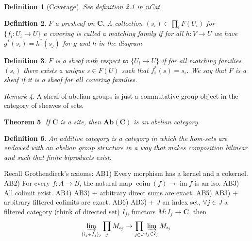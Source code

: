 \documentclass[12pt]{article}
\theoremstyle{darkgreentheorem}
\newtheorem{thm}{Theorem}[section]
\theoremstyle{darkbluedefinition}
\newtheorem{defn}[thm]{Definition}
\theoremstyle{darkredexample}
\theoremstyle{remark}
\newtheorem{rem}[thm]{Remark}
\newcommand{\1}{\mathbbm{1}}
\newcommand{\bfC}{\mathbf{C}}
\newcommand{\Ab}{\mathbf{Ab}}
\DeclareMathOperator{\im}{im}
\begin{document}
\begin{defn}[Coverage]
    See definition 2.1 in \href{https://ncatlab.org/nlab/show/coverage}{nCat}.
\end{defn}

\begin{defn}
    $F$ a presheaf on $\bfC$.
    A collection $(s_{i})\in \prod_{i}F(U_{i})$ for $\{f_{i}\colon U_{i}\to U\}$ a covering is called a \textit{matching family} if for all $h\colon V\to U$ we have $g^{*}(s_{i})=h^{*}(s_{j})$ for $g$ and $h$ in the diagram
    \begin{center}
    \end{center}
\end{defn}

\begin{defn}
    $F$ is a sheaf with respect to $\{U_{i}\to U\}$ if for all matching families $(s_{i})$ there exists a unique $s\in F(U)$ such that $f_{i}^{*}(s)=s_{i}$.
    We say that $F$ is a \textit{sheaf} if it is a sheaf for all covering families.
\end{defn}

\begin{rem}
    A sheaf of abelian groups is just a commutative group object in the category of sheaves of sets.
\end{rem}

\begin{thm}
    If $\bfC$ is a site, then $\Ab(\bfC)$ is an abelian category.
\end{thm}

\begin{defn}
    An additive category is a category in which the hom-sets are endowed with an abelian group structure in a way that makes composition bilinear and such that finite biproducts exist.
\end{defn}

Recall Grothendieck's axioms:
AB1) Every morphism has a kernel and a cokernel.
AB2) For every $f\colon A\to B$, the natural map $\operatorname{coim}(f)\to \im{f}$ is an iso.
AB3) All colimit exist.
AB4) AB3) + arbitrary direct sums are exact.
AB5) AB3) + arbitrary filtered colimits are exact.
AB6) AB3) + $J$ an index set, $\forall j\in J$ a filtered category (think of directed set) $I_{j}$, functors $M\colon I_{j}\to \bfC$, then
\[\varinjlim_{(i_{j}\in I_{j})_{j}}\prod_{j} M_{i_{j}}\to \prod_{j\in J}\varinjlim_{i_{j}\in I_{j}} M_{i_{j}} \]
\end{document}
